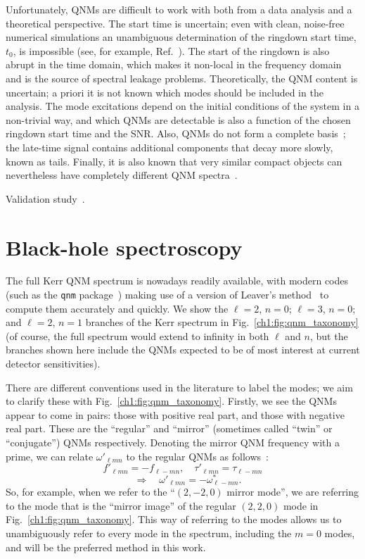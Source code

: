 Unfortunately, QNMs are difficult to work with both from a data analysis and a theoretical perspective. 
The start time is uncertain; even with clean, noise-free numerical simulations an unambiguous determination of the ringdown start time, $t_0$, is impossible (see, for example, Ref.~\cite{Thrane:2017lqn}). 
The start of the ringdown is also abrupt in the time domain, which makes it non-local in the frequency domain and is the source of spectral leakage problems. 
Theoretically, the QNM content is uncertain; a priori it is not known which modes should be included in the analysis.
The mode excitations depend on the initial conditions of the system in a non-trivial way, and which QNMs are detectable is also a function of the chosen ringdown start time and the SNR.
Also, QNMs do not form a complete basis~\cite{Berti:2009kk}; the late-time signal contains additional components that decay more slowly, known as tails.
Finally, it is also known that very similar compact objects can nevertheless have completely different QNM spectra~\cite{Nollert:1996rf}.

Validation study~\cite{Baibhav:2017jhs}.

\section{Black-hole spectroscopy}
\label{ch1:sec:bh_spectroscopy}

The full Kerr QNM spectrum is nowadays readily available, with modern codes (such as the \texttt{qnm} package~\cite{Stein:2019mop}) making use of a version of Leaver's method~\cite{Leaver:1985ax} to compute them accurately and quickly.
We show the $\ell = 2$, $n = 0$; $\ell = 3$, $n = 0$; and $\ell = 2$, $n = 1$ branches of the Kerr spectrum in Fig.~\ref{ch1:fig:qnm_taxonomy} (of course, the full spectrum would extend to infinity in both $\ell$ and $n$, but the branches shown here include the QNMs expected to be of most interest at current detector sensitivities).  

There are different conventions used in the literature to label the modes; we aim to clarify these with Fig.~\ref{ch1:fig:qnm_taxonomy}.
Firstly, we see the QNMs appear to come in pairs: those with positive real part, and those with negative real part.
These are the ``regular'' and ``mirror'' (sometimes called ``twin'' or ``conjugate'') QNMs respectively.
Denoting the mirror QNM frequency with a prime, we can relate $\omega'_{\ell m n}$ to the regular QNMs as follows~\cite{Berti:2005ys}:
\begin{equation}
    f'_{\ell m n} = -f_{\ell -m n}, \quad \tau'_{\ell m n} = \tau_{\ell -m n} \nonumber
\end{equation}
\begin{equation} 
    \quad\Rightarrow\quad \omega'_{\ell m n} = - \omega_{\ell -mn}^*.
    \label{ch1:eq:mirror}
\end{equation}
So, for example, when we refer to the ``$(2,-2,0)$ mirror mode'', we are referring to the mode that is the ``mirror image'' of the regular $(2,2,0)$ mode in Fig.~\ref{ch1:fig:qnm_taxonomy}.
This way of referring to the modes allows us to unambiguously refer to every mode in the spectrum, including the $m=0$ modes, and will be the preferred method in this work.

